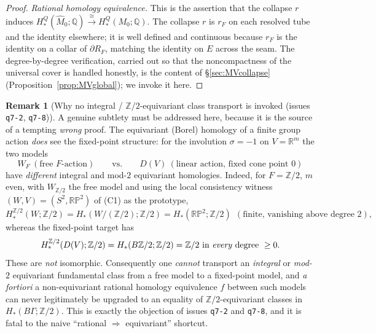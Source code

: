 \documentclass[12pt]{article}
\theoremstyle{definition}
\newtheorem{remark}[theorem]{Remark}
\begin{document}
\begin{proof}
\emph{Rational homology equivalence.} This is the assertion that the collapse
$r$ induces $H^Q_*(\widehat M_0;\mathbb{Q})\xrightarrow{\cong}H^Q_*(M_0;\mathbb{Q})$.
The collapse $r$ is $r_F$ on each resolved tube and the identity elsewhere; it is
well defined and continuous because $r_F$ is the identity on a collar of
$\partial R_F$, matching the identity on $E$ across the seam. The degree-by-degree
verification, carried out so that the noncompactness of the universal cover is
handled honestly, is the content of \S\ref{sec:MVcollapse}
(Proposition~\ref{prop:MVglobal}); we invoke it here.
\end{proof}

\begin{remark}[Why no integral / $\mathbb{Z}/2$-equivariant class transport is
invoked (issues \texttt{q7-2}, \texttt{q7-8})]\label{rem:equiv-transport}
A genuine subtlety must be addressed here, because it is the source of a tempting
\emph{wrong} proof. The equivariant (Borel) homology of a finite group action
\emph{does} see the fixed-point structure: for the involution $\sigma=-1$ on
$V=\mathbb{R}^m$ the two models
\[
   W_F\ (\text{free }F\text{-action})\qquad\text{vs.}\qquad
   D(V)\ (\text{linear action, fixed cone point }0)
\]
have \emph{different} integral and mod-$2$ equivariant homologies. Indeed, for
$F=\mathbb{Z}/2$, $m$ even, with $W_{\mathbb{Z}/2}$ the free model and using the
local consistency witness $(W,V)=(S^2,\mathbb{RP}^2)$ of (C1) as the
prototype,
\[
   H^{\mathbb{Z}/2}_*(W;\mathbb{Z}/2)=H_*(W/(\mathbb{Z}/2);\mathbb{Z}/2)
   =H_*(\mathbb{RP}^2;\mathbb{Z}/2)\ \ (\text{finite, vanishing above degree }2),
\]
whereas the fixed-point target has
\[
   H^{\mathbb{Z}/2}_*(D(V);\mathbb{Z}/2)=H_*(B\mathbb{Z}/2;\mathbb{Z}/2)
   =\mathbb{Z}/2\ \text{in \emph{every} degree}\ \ge0 .
\]
These are \emph{not} isomorphic. Consequently one \emph{cannot} transport an
\emph{integral} or \emph{mod-$2$} equivariant fundamental class from a free model
to a fixed-point model, and \emph{a fortiori} a non-equivariant rational homology
equivalence $f$ between such models can never legitimately be upgraded to an
equality of $\mathbb{Z}/2$-equivariant classes in $H_*(B\Gamma;\mathbb{Z}/2)$.
This is exactly the objection of issues \texttt{q7-2} and \texttt{q7-8}, and it is
fatal to the naive ``rational $\Rightarrow$ equivariant'' shortcut.


\end{remark}
\end{document}
